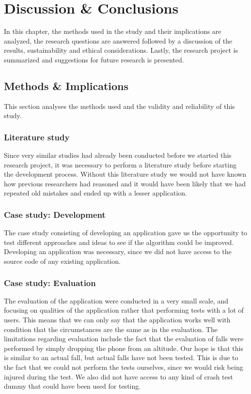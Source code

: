 \documentclass[12pt, a4paper, onecolumn]{article}
\begin{document}
	\newpage
	\section{Discussion \& Conclusions} \label{section:discussion}
	
	In this chapter, the methods used in the study and their implications are analyzed, the research questions are answered followed by a discussion of the results, sustainability and ethical considerations. Lastly, the research project is summarized and suggestions for future research is presented.
	
	\subsection{Methods \& Implications}
	
	This section analyses the methods used and the validity and reliability of this study.
	
	\subsubsection{Literature study}
	
	Since very similar studies had already been conducted before we started this research project, it was necessary to perform a literature study before starting the development process. Without this literature study we would not have known how previous researchers had reasoned and it would have been likely that we had repeated old mistakes and ended up with a lesser application.
	
	\subsubsection{Case study: Development}
	
	The case study consisting of developing an application gave us the opportunity to test different approaches and ideas to see if the algorithm could be improved. Developing an application was necessary, since we did not have access to the source code of any existing application.
	
	\subsubsection{Case study: Evaluation}
	
	The evaluation of the application were conducted in a very small scale, and focusing on qualities of the application rather that performing tests with a lot of users. This means that we can only say that the application works well with condition that the circumstances are the same as in the evaluation. The limitations regarding evaluation include the fact that the evaluation of falls were performed by simply dropping the phone from an altitude. Our hope is that this is similar to an actual fall, but actual falls have not been tested. This is due to the fact that we could not perform the tests ourselves, since we would risk being injured during the test. We also did not have access to any kind of crash test dummy that could have been used for testing.
	
\end{document}
